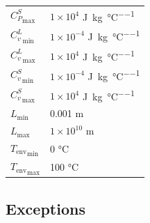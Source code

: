 \documentclass[12pt, titlepage]{article}
\begin{document}
\begin{table}[!h]
\begin{longtable*}{l l}
  ${C_P^S}_{\mbox{max}}$ & $1 \times 10^{4}$ \si{\joule \per \kilogram \per \celsius}\\
  ${C_v^L}_{\mbox{min}}$ & $1 \times 10^{-4}$ \si{\joule \per \kilogram \per \celsius}\\
  ${C_v^L}_{\mbox{max}}$ & $1 \times 10^{4}$ \si{\joule \per \kilogram \per \celsius}\\
  ${C_v^S}_{\mbox{min}}$ & $1 \times 10^{-4}$ \si{\joule \per \kilogram \per \celsius}\\
  ${C_v^S}_{\mbox{max}}$ & $1 \times 10^{4}$ \si{\joule \per \kilogram \per \celsius}\\
  $L_{\mbox{min}}$ & 0.001 \si{\metre}\\
  $L_{\mbox{max}}$ & $1 \times 10^{10}$ \si{\metre}\\
  ${T_{\mbox{env}}}_{\mbox{min}}$ & 0 \si{\celsius}\\
  ${T_{\mbox{env}}}_{\mbox{max}}$ & 100 \si{\celsius}\\

  \bottomrule
\end{longtable*}
\end{table}


\subsection{Exceptions} \label{exception}

\renewcommand{\arraystretch}{1.2}
\end{document}
